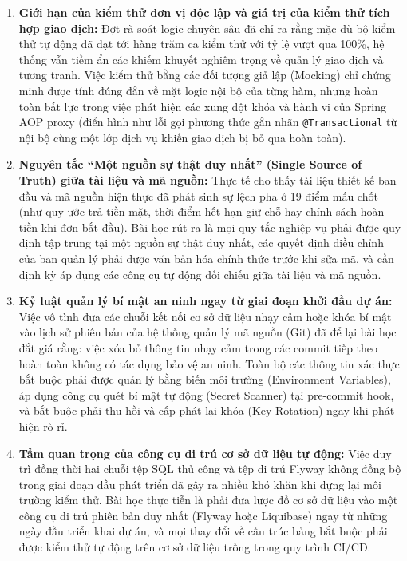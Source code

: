 \begin{enumerate}
    \item \textbf{Giới hạn của kiểm thử đơn vị độc lập và giá trị của kiểm thử tích hợp giao dịch:} Đợt rà soát logic chuyên sâu đã chỉ ra rằng mặc dù bộ kiểm thử tự động đã đạt tới hàng trăm ca kiểm thử với tỷ lệ vượt qua 100\%, hệ thống vẫn tiềm ẩn các khiếm khuyết nghiêm trọng về quản lý giao dịch và tương tranh. Việc kiểm thử bằng các đối tượng giả lập (Mocking) chỉ chứng minh được tính đúng đắn về mặt logic nội bộ của từng hàm, nhưng hoàn toàn bất lực trong việc phát hiện các xung đột khóa và hành vi của Spring AOP proxy (điển hình như lỗi gọi phương thức gắn nhãn \texttt{@Transactional} từ nội bộ cùng một lớp dịch vụ khiến giao dịch bị bỏ qua hoàn toàn).
    
    \item \textbf{Nguyên tắc ``Một nguồn sự thật duy nhất'' (Single Source of Truth) giữa tài liệu và mã nguồn:} Thực tế cho thấy tài liệu thiết kế ban đầu và mã nguồn hiện thực đã phát sinh sự lệch pha ở 19 điểm mấu chốt (như quy ước trả tiền mặt, thời điểm hết hạn giữ chỗ hay chính sách hoàn tiền khi đơn bắt đầu). Bài học rút ra là mọi quy tắc nghiệp vụ phải được quy định tập trung tại một nguồn sự thật duy nhất, các quyết định điều chỉnh của ban quản lý phải được văn bản hóa chính thức trước khi sửa mã, và cần định kỳ áp dụng các công cụ tự động đối chiếu giữa tài liệu và mã nguồn.
    
    \item \textbf{Kỷ luật quản lý bí mật an ninh ngay từ giai đoạn khởi đầu dự án:} Việc vô tình đưa các chuỗi kết nối cơ sở dữ liệu nhạy cảm hoặc khóa bí mật vào lịch sử phiên bản của hệ thống quản lý mã nguồn (Git) đã để lại bài học đắt giá rằng: việc xóa bỏ thông tin nhạy cảm trong các commit tiếp theo hoàn toàn không có tác dụng bảo vệ an ninh. Toàn bộ các thông tin xác thực bắt buộc phải được quản lý bằng biến môi trường (Environment Variables), áp dụng công cụ quét bí mật tự động (Secret Scanner) tại pre-commit hook, và bắt buộc phải thu hồi và cấp phát lại khóa (Key Rotation) ngay khi phát hiện rò rỉ.
    
    \item \textbf{Tầm quan trọng của công cụ di trú cơ sở dữ liệu tự động:} Việc duy trì đồng thời hai chuỗi tệp SQL thủ công và tệp di trú Flyway không đồng bộ trong giai đoạn đầu phát triển đã gây ra nhiều khó khăn khi dựng lại môi trường kiểm thử. Bài học thực tiễn là phải đưa lược đồ cơ sở dữ liệu vào một công cụ di trú phiên bản duy nhất (Flyway hoặc Liquibase) ngay từ những ngày đầu triển khai dự án, và mọi thay đổi về cấu trúc bảng bắt buộc phải được kiểm thử tự động trên cơ sở dữ liệu trống trong quy trình CI/CD.
\end{enumerate}

